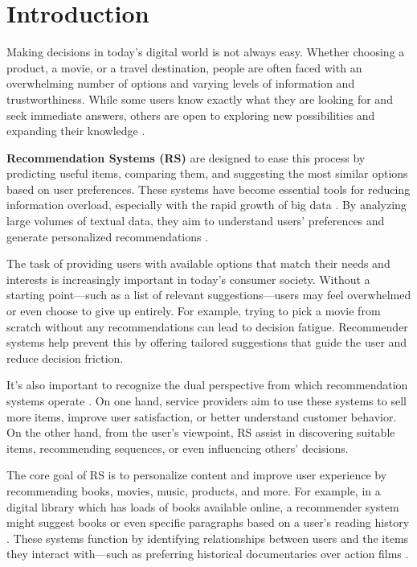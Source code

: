 \documentclass{llncs}
\begin{document}
\section{Introduction}
Making decisions in today’s digital world is not always easy. Whether choosing a product, a movie, or a travel destination, people are often faced with an overwhelming number of options and varying levels of information and trustworthiness. While some users know exactly what they are looking for and seek immediate answers, others are open to exploring new possibilities and expanding their knowledge \cite{Blanco201333}.

\textbf{Recommendation Systems (RS)} are designed to ease this process by predicting useful items, comparing them, and suggesting the most similar options based on user preferences. These systems have become essential tools for reducing information overload, especially with the rapid growth of big data \cite{Haruna2017}. By analyzing large volumes of textual data, they aim to understand users’ preferences and generate personalized recommendations \cite{Yan2024}.

The task of providing users with available options that match their needs and interests is increasingly important in today’s consumer society. Without a starting point—such as a list of relevant suggestions—users may feel overwhelmed or even choose to give up entirely. For example, trying to pick a movie from scratch without any recommendations can lead to decision fatigue. Recommender systems help prevent this by offering tailored suggestions that guide the user and reduce decision friction.

It’s also important to recognize the dual perspective from which recommendation systems operate \cite{Ricci20221}. On one hand, service providers aim to use these systems to sell more items, improve user satisfaction, or better understand customer behavior. On the other hand, from the user’s viewpoint, RS assist in discovering suitable items, recommending sequences, or even influencing others' decisions.

The core goal of RS is to personalize content and improve user experience by recommending books, movies, music, products, and more. For example, in a digital library which has loads of books available online, a recommender system might suggest books or even specific paragraphs based on a user’s reading history \cite{Zangerle2023}. These systems function by identifying relationships between users and the items they interact with—such as preferring historical documentaries over action films \cite{pub.1022525812}.
\end{document}

